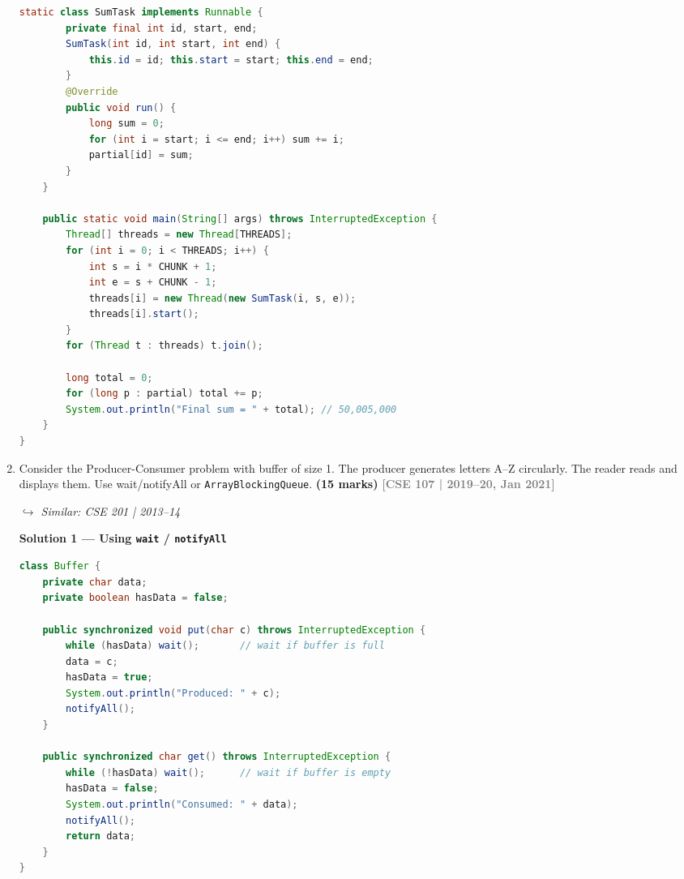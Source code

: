 \documentclass[12pt,a3paper]{article}
\newcommand{\yr}[1]{\hfill\textcolor{gray}{\small\textbf{[#1]}}}
\newcommand{\mk}[1]{\textcolor{orange!70!black}{\small\textbf{(#1 marks)}}}
\newcommand{\variant}[1]{\par\vspace{1pt}\textcolor{blue!50!black}%
  {\footnotesize\textit{$\hookrightarrow$ Similar: #1}}}
\begin{document}
\begin{enumerate}
\begin{tcolorbox}
\begin{lstlisting}[language=Java]
    static class SumTask implements Runnable {
        private final int id, start, end;
        SumTask(int id, int start, int end) {
            this.id = id; this.start = start; this.end = end;
        }
        @Override
        public void run() {
            long sum = 0;
            for (int i = start; i <= end; i++) sum += i;
            partial[id] = sum;
        }
    }

    public static void main(String[] args) throws InterruptedException {
        Thread[] threads = new Thread[THREADS];
        for (int i = 0; i < THREADS; i++) {
            int s = i * CHUNK + 1;
            int e = s + CHUNK - 1;
            threads[i] = new Thread(new SumTask(i, s, e));
            threads[i].start();
        }
        for (Thread t : threads) t.join();

        long total = 0;
        for (long p : partial) total += p;
        System.out.println("Final sum = " + total); // 50,005,000
    }
}
\end{lstlisting}

\end{tcolorbox}

\item Consider the Producer-Consumer problem with buffer of size 1. The producer generates letters A--Z circularly. The reader reads and displays them. Use wait/notifyAll or \texttt{ArrayBlockingQueue}. \mk{15}
\yr{CSE 107 | 2019--20, Jan 2021}
\variant{CSE 201 | 2013--14}

\begin{tcolorbox}[enhanced,breakable,ansbox,
  colback=cF!4,colframe=cF,boxrule=0.8pt,arc=5pt,
  title={\textbf{Answer --- Producer-Consumer: A--Z Circular, Buffer Size 1}},
  fonttitle=\bfseries\color{white},colbacktitle=cF]

\textbf{Solution 1 --- Using \texttt{wait} / \texttt{notifyAll}}

\begin{lstlisting}[language=Java]
class Buffer {
    private char data;
    private boolean hasData = false;

    public synchronized void put(char c) throws InterruptedException {
        while (hasData) wait();       // wait if buffer is full
        data = c;
        hasData = true;
        System.out.println("Produced: " + c);
        notifyAll();
    }

    public synchronized char get() throws InterruptedException {
        while (!hasData) wait();      // wait if buffer is empty
        hasData = false;
        System.out.println("Consumed: " + data);
        notifyAll();
        return data;
    }
}


\end{lstlisting}
\end{tcolorbox}
\end{enumerate}
\end{document}
